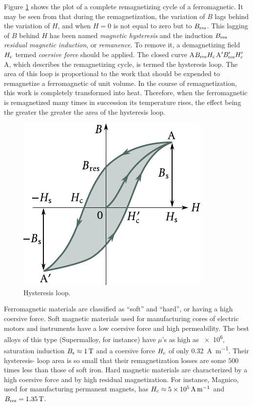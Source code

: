 Figure \ref{fig:7_3} shows the plot of a complete remagnetizing cycle of a ferromagnetic. It may be seen from  that during the remagnetization, the variation of $B$ lags behind the variation of $H$, and when $H=0$ is not equal to zero but to $B_{\text{res}}$. This lagging of $B$ behind $H$ has been named \textit{magnetic hysteresis} and the induction $B_{\text{res}}$ \textit{residual magnetic induction}, or \textit{remanence}.
To remove it, a demagnetizing field $H_{\text{c}}$ termed \textit{coersive force} should be applied. The closed curve A$B_{\text{res}}H_{\text{c}}$A$'B_{\text{res}}'H_{\text{c}}'$A, which describes the remagnetizing cycle, is termed the hysteresis loop. The area of this loop is proportional to the work that should be expended to remagnetize a ferromagnetic of unit volume. In the course of remagnetization, this work is completely
transformed into heat. Therefore, when the ferromagnetic is remagnetized many times in succession its temperature rises, the effect being the greater the greater the area of the hysteresis loop.

\begin{figure}[t]
	\begin{center}
		\includegraphics[scale=1]{figures/ch_07/fig_7_3.pdf}
		\caption[]{Hysteresis loop.}
		\label{fig:7_3}
	\end{center}
	\vspace{-0.7cm}
\end{figure}

Ferromagnetic materials are classified as ``soft'' and ``hard'', or having a high coersive force. Soft magnetic materials used for manufacturing cores of electric motors and instruments have a low coersive force and high permeability. The best alloys of this type (Supermalloy, for instance) have $\mu$'s as high as \num{e6}, saturation induction $B_{\text{s}}\approx\SI{1}{\tesla}$ and a coersive force $H_{\text{c}}$ of only \SI{0.32}{\ampere\per\metre}. Their hysteresis-
loop area is so small that their remagnetization losses are some $500$ times less than those of soft iron. Hard magnetic materials are characterized by a high coersive force and by high residual magnetization. For instance, Magnico, used for manufacturing permanent magnets, has $H_{\text{c}}\approx\SI{5e5}{\ampere\per\metre}$ and $B_{\text{res}}=\SI{1.35}{\tesla}$.

